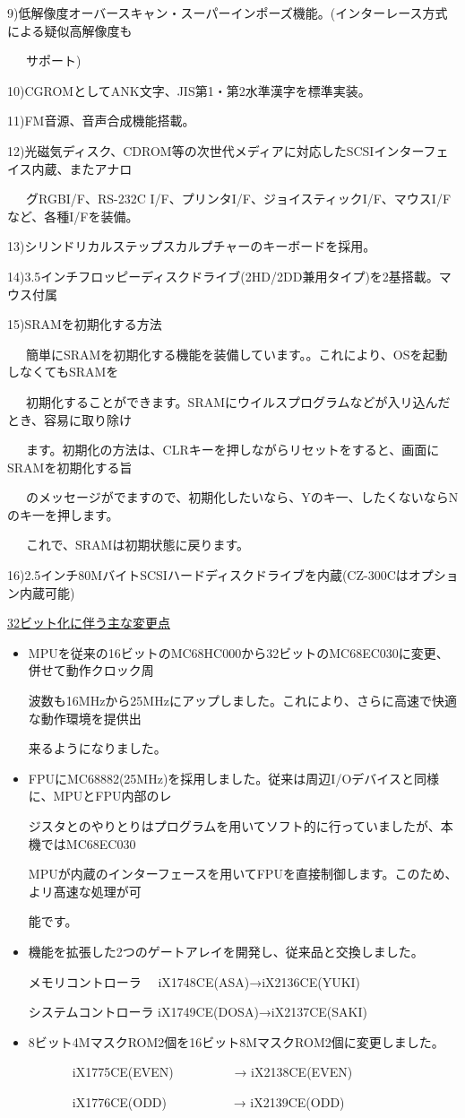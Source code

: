 \documentclass[twoside,a4paper,12pt]{article}
\begin{document}
9)低解像度オーバースキャン・スーパーインポーズ機能。(インターレース方式による疑似高解像度も

\ \ \ サポート)

10)CGROMとしてANK文字、JIS第1・第2水準漢字を標準実装。

11)FM音源、音声合成機能搭載。

12)光磁気ディスク、CDROM等の次世代メディアに対応したSCSIインターフェイス内蔵、またアナロ

\ \ \ グRGBI/F、RS-232C I/F、プリンタI/F、ジョイスティックI/F、マウスI/Fなど、各種I/Fを装備。

13)シリンドリカルステップスカルプチャーのキーボードを採用。

14)3.5インチフロッピーディスクドライブ(2HD/2DD兼用タイプ)を2基搭載。マウス付属

15)SRAMを初期化する方法

\ \ \ 簡単にSRAMを初期化する機能を装備しています。。これにより、OSを起動しなくてもSRAMを

\ \ \ 初期化することができます。SRAMにウイルスプログラムなどが入リ込んだとき、容易に取り除け

\ \ \ ます。初期化の方法は、CLRキーを押しながらリセットをすると、画面にSRAMを初期化する旨

\ \ \ のメッセージがでますので、初期化したいなら、Yのキ一、したくないならNのキ一を押します。

\ \ \ これで、SRAMは初期状態に戻ります。

16)2.5インチ80MバイトSCSIハードディスクドライブを内蔵(CZ-300Cはオプション内蔵可能)

\newpage

\normalsize\uline{32ビット化に伴う主な変更点}

\renewcommand{\labelitemi}{\scriptsize●}
\small
\begin{itemize}[leftmargin=25mm, itemsep=-1mm, topsep=1mm]
\item
MPUを従来の16ビットのMC68HC000から32ビットのMC68EC030に変更、併せて動作クロック周

波数も16MHzから25MHzにアップしました。これにより、さらに高速で快適な動作環境を提供出

来るようになりました。
\item
FPUにMC68882(25MHz)を採用しました。従来は周辺I/Oデバイスと同様に、MPUとFPU内部のレ

ジスタとのやりとりはプログラムを用いてソフト的に行っていましたが、本機ではMC68EC030

MPUが内蔵のインターフェースを用いてFPUを直接制御します。このため、よリ髙速な処理が可

能です。
\item
機能を拡張した2つのゲートアレイを開発し、従来品と交換しました。

メモリコントローラ \ \ iX1748CE(ASA)→iX2136CE(YUKI)

システムコントローラ iX1749CE(DOSA)→iX2137CE(SAKI)
\item
8ビット4MマスクROM2個を16ビット8MマスクROM2個に変更しました。

\ \ \ \ \ \ \ iX1775CE(EVEN) \ \ \ \ \ \ \ \ \ → iX2138CE(EVEN)

\ \ \ \ \ \ \ iX1776CE(ODD) \ \ \ \ \ \ \ \ \ \ → iX2139CE(ODD)
\end{itemize}
\end{document}
